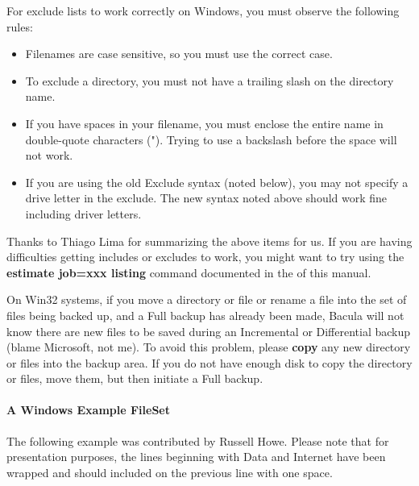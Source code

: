 For exclude lists to work correctly on Windows, you must observe the following
rules: 

\begin{itemize}
\item Filenames are case sensitive, so you must use the correct case.  
\item To exclude a directory, you must not have a trailing slash on the 
   directory name.  
\item If you have spaces in your filename, you must enclose the entire name 
   in double-quote characters ("). Trying to use a backslash before  the space
   will not work.  
\item If you are using the old Exclude syntax (noted below), you may not
   specify a drive letter in the exclude.  The new syntax noted above
   should work fine including driver letters.
\end{itemize}

Thanks to Thiago Lima for summarizing the above items for us. If you are
having difficulties getting includes or excludes to work, you might want to
try using the {\bf estimate job=xxx listing} command documented in the 
 of this manual. 

On Win32 systems, if you move a directory or file or rename a file into the
set of files being backed up, and a Full backup has already been made, Bacula
will not know there are new files to be saved during an Incremental or
Differential backup (blame Microsoft, not me). To avoid this problem, please
{\bf copy} any new directory or files into the backup area. If you do not have
enough disk to copy the directory or files, move them, but then initiate a
Full backup. 


\paragraph*{A Windows Example FileSet}

The following example was contributed by Russell Howe. Please note that
for presentation purposes, the lines beginning with Data and Internet 
have been wrapped and should included on the previous line with one
space.

